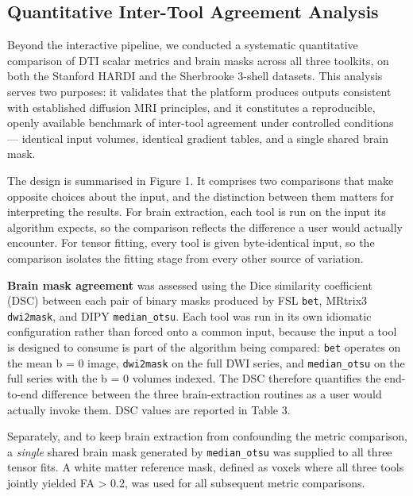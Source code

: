 \documentclass[12pt,a4paper]{article}
\begin{document}
\subsection{Quantitative Inter-Tool Agreement Analysis}\label{quantitative-inter-tool-agreement-analysis}

Beyond the interactive pipeline, we conducted a systematic quantitative comparison of DTI scalar metrics and brain masks across all three toolkits, on both the Stanford HARDI and the Sherbrooke 3-shell datasets. This analysis serves two purposes: it validates that the platform produces outputs consistent with established diffusion MRI principles, and it constitutes a reproducible, openly available benchmark of inter-tool agreement under controlled conditions --- identical input volumes, identical gradient tables, and a single shared brain mask.

The design is summarised in Figure 1. It comprises two comparisons that make opposite choices about the input, and the distinction between them matters for interpreting the results. For brain extraction, each tool is run on the input its algorithm expects, so the comparison reflects the difference a user would actually encounter. For tensor fitting, every tool is given byte-identical input, so the comparison isolates the fitting stage from every other source of variation.

\textbf{Brain mask agreement} was assessed using the Dice similarity coefficient (DSC) between each pair of binary masks produced by FSL \texttt{bet}, MRtrix3 \texttt{dwi2mask}, and DIPY \texttt{median\_otsu}. Each tool was run in its own idiomatic configuration rather than forced onto a common input, because the input a tool is designed to consume is part of the algorithm being compared: \texttt{bet} operates on the mean b = 0 image, \texttt{dwi2mask} on the full DWI series, and \texttt{median\_otsu} on the full series with the b = 0 volumes indexed. The DSC therefore quantifies the end-to-end difference between the three brain-extraction routines as a user would actually invoke them. DSC values are reported in Table 3.

Separately, and to keep brain extraction from confounding the metric comparison, a \emph{single} shared brain mask generated by \texttt{median\_otsu} was supplied to all three tensor fits. A white matter reference mask, defined as voxels where all three tools jointly yielded FA \textgreater{} 0.2, was used for all subsequent metric comparisons.
\end{document}
